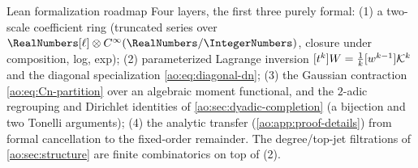 \begin{statuspanel}{Lean formalization roadmap}
Four layers, the first three purely formal:
(1) a two-scale coefficient ring (truncated series over
$\RealNumbers[\ell]\otimes C^\infty(\RealNumbers/\IntegerNumbers)$, closure under composition, log,
exp); (2) parameterized Lagrange inversion
$[t^{k}]W=\tfrac1k[w^{k-1}]\mathcal K^{k}$ and the diagonal specialization
\eqref{ao:eq:diagonal-dn}; (3) the Gaussian contraction
\eqref{ao:eq:Cn-partition} over an algebraic moment functional, and the
$2$-adic regrouping and Dirichlet identities of
\cref{ao:sec:dyadic-completion} (a bijection and two Tonelli
arguments); (4) the analytic transfer
(\cref{ao:app:proof-details}) from formal cancellation to the
fixed-order remainder.  The degree/top-jet filtrations of
\cref{ao:sec:structure} are finite combinatorics on top of (2).
\end{statuspanel}

\appendix
